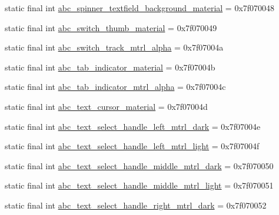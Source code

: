 \begin{DoxyCompactItemize}
static final int \mbox{\hyperlink{classandroid_1_1support_1_1design_1_1_r_1_1drawable_a46a7523b2bf448075a84dea597735916}{abc\+\_\+spinner\+\_\+textfield\+\_\+background\+\_\+material}} = 0x7f070048
\item 
static final int \mbox{\hyperlink{classandroid_1_1support_1_1design_1_1_r_1_1drawable_a3a7eda576b66b008b9973477103ad769}{abc\+\_\+switch\+\_\+thumb\+\_\+material}} = 0x7f070049
\item 
static final int \mbox{\hyperlink{classandroid_1_1support_1_1design_1_1_r_1_1drawable_a2c00fcab8bac6c66dbe2d1a34992f941}{abc\+\_\+switch\+\_\+track\+\_\+mtrl\+\_\+alpha}} = 0x7f07004a
\item 
static final int \mbox{\hyperlink{classandroid_1_1support_1_1design_1_1_r_1_1drawable_a1df6dff38e80904864f9d1b16188e4b0}{abc\+\_\+tab\+\_\+indicator\+\_\+material}} = 0x7f07004b
\item 
static final int \mbox{\hyperlink{classandroid_1_1support_1_1design_1_1_r_1_1drawable_a7e95b663c60c56e55380a5750cbaf5e3}{abc\+\_\+tab\+\_\+indicator\+\_\+mtrl\+\_\+alpha}} = 0x7f07004c
\item 
static final int \mbox{\hyperlink{classandroid_1_1support_1_1design_1_1_r_1_1drawable_ab7d0879432ccba232192251a071145bc}{abc\+\_\+text\+\_\+cursor\+\_\+material}} = 0x7f07004d
\item 
static final int \mbox{\hyperlink{classandroid_1_1support_1_1design_1_1_r_1_1drawable_a3443ebe1b5b8906ed4c9677002c296d5}{abc\+\_\+text\+\_\+select\+\_\+handle\+\_\+left\+\_\+mtrl\+\_\+dark}} = 0x7f07004e
\item 
static final int \mbox{\hyperlink{classandroid_1_1support_1_1design_1_1_r_1_1drawable_abf62ec497910e78f0b8f0f910c5336cc}{abc\+\_\+text\+\_\+select\+\_\+handle\+\_\+left\+\_\+mtrl\+\_\+light}} = 0x7f07004f
\item 
static final int \mbox{\hyperlink{classandroid_1_1support_1_1design_1_1_r_1_1drawable_a9eab4bb52b1d5504fcd64d3c044bb384}{abc\+\_\+text\+\_\+select\+\_\+handle\+\_\+middle\+\_\+mtrl\+\_\+dark}} = 0x7f070050
\item 
static final int \mbox{\hyperlink{classandroid_1_1support_1_1design_1_1_r_1_1drawable_a1a4f045c0995543f87ebdf598f654cc8}{abc\+\_\+text\+\_\+select\+\_\+handle\+\_\+middle\+\_\+mtrl\+\_\+light}} = 0x7f070051
\item 
static final int \mbox{\hyperlink{classandroid_1_1support_1_1design_1_1_r_1_1drawable_a06ea64d6a64430f4efeb94307a7dff65}{abc\+\_\+text\+\_\+select\+\_\+handle\+\_\+right\+\_\+mtrl\+\_\+dark}} = 0x7f070052
\item 

\end{DoxyCompactItemize}
